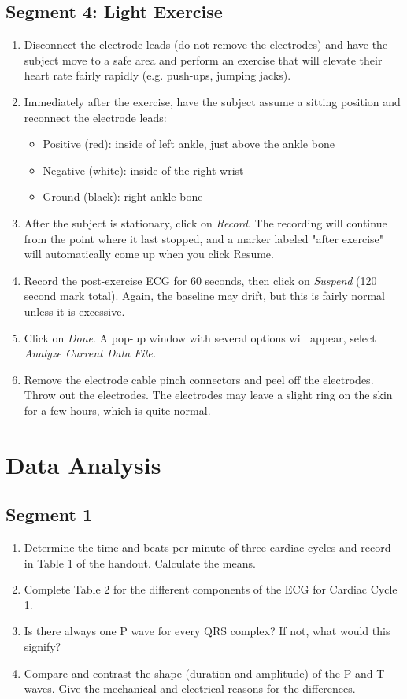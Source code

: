 \documentclass{article}
\begin{document}
\subsection*{Segment 4: Light Exercise}
\begin{enumerate}
	\item Disconnect the electrode leads (do not remove the electrodes) and have the subject move to a safe area and perform an exercise that will elevate their heart rate fairly rapidly (e.g. push-ups, jumping jacks).
	\item Immediately after the exercise, have the subject assume a sitting position and reconnect the electrode leads: \begin{itemize}
		\item Positive (red): inside of left ankle, just above the ankle bone
		\item Negative (white): inside of the right wrist
		\item Ground (black): right ankle bone
	\end{itemize}
	
	\item After the subject is stationary, click on \textit{Record}. The recording will continue from the point where it last stopped, and a marker labeled "after exercise" will automatically come up when you click Resume.
	\item Record the post-exercise ECG for 60 seconds, then click on \textit{Suspend} (120 second mark total). Again, the baseline may drift, but this is fairly normal unless it is excessive.
	\item Click on \textit{Done}. A pop-up window with several options will appear, select \textit{Analyze Current Data File.}
	\item Remove the electrode cable pinch connectors and peel off the electrodes. Throw out the electrodes. The electrodes may leave a slight ring on the skin for a few hours, which is quite normal.
\end{enumerate}

\section*{Data Analysis}
\subsection*{Segment 1}
\begin{enumerate}
	\item Determine the time and beats per minute of three cardiac cycles and record in Table 1 of the handout. Calculate the means.
	\item Complete Table 2 for the different components of the ECG for Cardiac Cycle 1.
	\item Is there always one P wave for every QRS complex? If not, what would this signify?
	\item Compare and contrast the shape (duration and amplitude) of the P and T waves. Give the mechanical and electrical reasons for the differences.
\end{enumerate}
\end{document}
